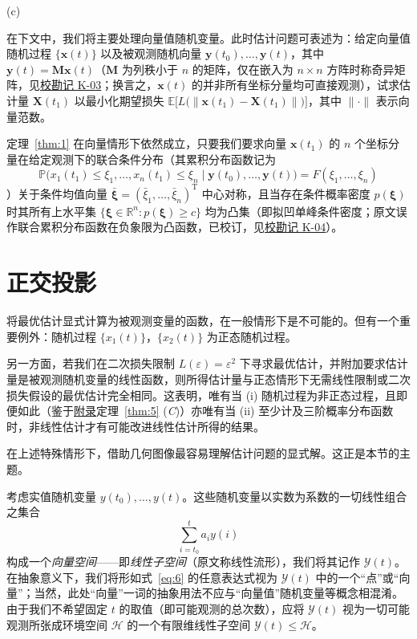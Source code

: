 \begin{remarkn}{(c)}\label{rem:c}

在下文中，我们将主要处理向量值随机变量。此时估计问题可表述为：给定向量值随机过程 $\{\bm{x}(t)\}$ 以及被观测随机向量 $\bm{y}(t_0), \dots, \bm{y}(t)$，其中 $\bm{y}(t) = \bm{M}\bm{x}(t)$（$\bm{M}$ 为列秩小于 $n$ 的矩阵，仅在嵌入为 $n \times n$ 方阵时称奇异矩阵，见\hyperref[sec:k03]{校勘记 K-03}；换言之，$\bm{x}(t)$ 的并非所有坐标分量均可直接观测），试求估计量 $\bm{X}(t_1)$ 以最小化期望损失 $\mathbb{E}\bigl[L\bigl(\|\bm{x}(t_1) - \bm{X}(t_1)\|\bigr)\bigr]$，其中 $\|\cdot\|$ 表示向量范数。

定理~\ref{thm:1} 在向量情形下依然成立，只要我们要求向量 $\bm{x}(t_1)$ 的 $n$ 个坐标分量在给定观测下的联合条件分布（其累积分布函数记为
\begin{equation*}
\mathbb{P}\bigl(x_1(t_1) \leq \xi_1, \dots, x_n(t_1) \leq \xi_n \mid \bm{y}(t_0), \dots, \bm{y}(t)\bigr) = F(\xi_1, \dots, \xi_n)
\end{equation*}
）关于条件均值向量 $\bar{\bm{\xi}} = (\bar{\xi}_1, \dots, \bar{\xi}_n)^{\mathrm{T}}$ 中心对称，且当存在条件概率密度 $p(\bm{\xi})$ 时其所有上水平集 $\{\bm{\xi} \in \mathbb{R}^n : p(\bm{\xi}) \geq c\}$ 均为凸集（即拟凹单峰条件密度；原文误作联合累积分布函数在负象限为凸函数，已校订，见\hyperref[sec:k04]{校勘记 K-04}）。

\end{remarkn}

\section{正交投影}\label{sec:proj}

将最优估计显式计算为被观测变量的函数，在一般情形下是不可能的。但有一个重要例外：随机过程 $\{x_1(t)\}$，$\{x_2(t)\}$ 为正态随机过程。

另一方面，若我们在二次损失限制 $L(\varepsilon) = \varepsilon^2$ 下寻求最优估计，并附加要求估计量是被观测随机变量的线性函数，则所得估计量与正态情形下无需线性限制或二次损失假设的最优估计完全相同。这表明，唯有当 (i) 随机过程为非正态过程，且即便如此（鉴于\hyperref[sec:appendix]{附录}定理~\ref{thm:5} (\emph{C})）亦唯有当 (ii) 至少计及三阶概率分布函数时，非线性估计才有可能改进线性估计所得的结果。

在上述特殊情形下，借助几何图像最容易理解估计问题的显式解。这正是本节的主题。

考虑实值随机变量 $y(t_0), \dots, y(t)$。这些随机变量以实数为系数的一切线性组合之集合
\begin{equation}\label{eq:6}
\sum_{i=t_0}^{t} a_i y(i)
\end{equation}
构成一个\emph{向量空间}——即\emph{线性子空间}（原文称线性流形），我们将其记作 $\mathcal{Y}(t)$。在抽象意义下，我们将形如式~\eqref{eq:6} 的任意表达式视为 $\mathcal{Y}(t)$ 中的一个“点”或“向量”；当然，此处“向量”一词的抽象用法不应与“向量值”随机变量等概念相混淆。由于我们不希望固定 $t$ 的取值（即可能观测的总次数），应将 $\mathcal{Y}(t)$ 视为一切可能观测所张成环境空间 $\mathcal{H}$ 的一个有限维线性子空间 $\mathcal{Y}(t) \leqslant \mathcal{H}$。

